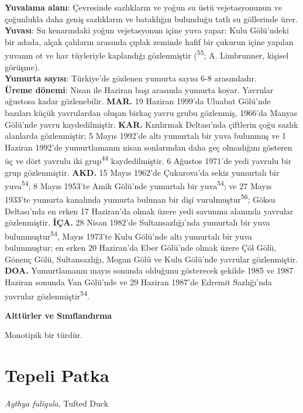 \documentclass[
  letterpaper,
  DIV=11,
  numbers=noendperiod]{scrreprt}
\begin{document}
\textbf{Yuvalama alanı}: Çevresinde sazlıkların ve yoğun su üstü
vejetasyonunun ve çoğunlukla daha geniş sazlıkların ve bataklığın
bulunduğu tatlı su göllerinde ürer.\\
\textbf{Yuvası}: Su kenarındaki yoğun vejetasyonun içine yuva yapar:
Kulu Gölü'ndeki bir adada, alçak çalıların arasında çıplak zeminde hafif
bir çukurun içine yapılan yuvanın ot ve hav tüyleriyle kaplandığı
gözlenmiştir (\textsuperscript{55}; A. Limbrunner, kişisel görüşme).\\
\textbf{Yumurta sayısı}: Türkiye'de gözlenen yumurta sayısı 6-8
arasındadır.\\
\textbf{Üreme dönemi}: Nisan ile Haziran başı arasında yumurta koyar.
Yavrular ağustosa kadar gözlenebilir. \textbf{MAR.} 19 Haziran 1999'da
Uluabat Gölü'nde bazıları küçük yavrulardan oluşan birkaç yavru grubu
gözlenmiş, 1966'da Manyas Gölü'nde yavru kaydedilmiştir. \textbf{KAR.}
Kızılırmak Deltası'nda çiftlerin çoğu sazlık alanlarda gözlenmiştir; 5
Mayıs 1992'de altı yumurtalı bir yuva bulunmuş ve 1 Haziran 1992'de
yumurtlamanın nisan sonlarından daha geç olmadığını gösteren üç ve dört
yavrulu iki grup\textsuperscript{44} kaydedilmiştir. 6 Ağustos 1971'de
yedi yavrulu bir grup gözlenmiştir. \textbf{AKD.} 15 Mayıs 1962'de
Çukurova'da sekiz yumurtalı bir yuva\textsuperscript{54}; 8 Mayıs
1953'te Amik Gölü'nde yumurtalı bir yuva\textsuperscript{54}; ve 27
Mayıs 1933'te yumurta kanalında yumurta bulunan bir dişi
vurulmuştur\textsuperscript{56}; Göksu Deltası'nda en erken 17
Haziran'da olmak üzere yedi savunma alanında yavrular gözlenmiştir.
\textbf{İÇA.} 28 Nisan 1982'de Sultansazlığı'nda yumurtalı bir yuva
bulunmuştur\textsuperscript{54}, Mayıs 1973'te Kulu Gölü'nde altı
yumurtalı bir yuva bulunmuştur; en erken 20 Haziran'da Eber Gölü'nde
olmak üzere Çöl Gölü, Gönenç Gölü, Sultansazlığı, Mogan Gölü ve Kulu
Gölü'nde yavrular gözlenmiştir. \textbf{DOA.} Yumurtlamanın mayıs
sonunda olduğunu gösterecek şekilde 1985 ve 1987 Haziran sonunda Van
Gölü'nde ve 29 Haziran 1987'de Edremit Sazlığı'nda yavrular
gözlenmiştir\textsuperscript{54}.

\textbf{Alttürler ve Sınıflandırma}

Monotipik bir türdür.

\section{Tepeli Patka}\label{tepeli-patka}

\emph{Aythya fuligula}, Tufted Duck
\end{document}
